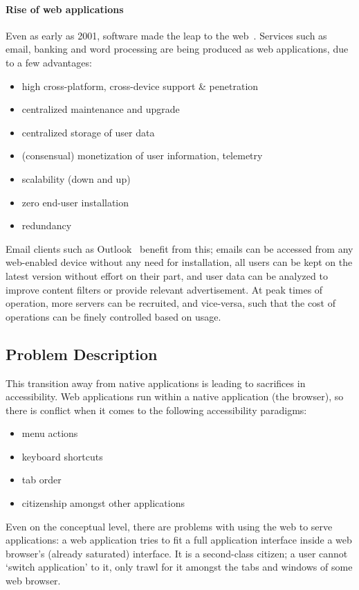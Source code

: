 \documentclass[a4paper, 11pt]{article}
\begin{document}
\paragraph{Rise of web applications}
Even as early as 2001, software made the leap to the web~\cite{ginige2001web}. Services such as email, banking and word processing are being produced as web applications, due to a few advantages:
\begin{itemize}
  \item high cross-platform, cross-device support \& penetration
  \item centralized maintenance and upgrade
  \item centralized storage of user data
  \item (consensual) monetization of user information, telemetry
  \item scalability (down and up)
  \item zero end-user installation
  \item redundancy
\end{itemize}
Email clients such as Outlook~\cite{outlookcom} benefit from this; emails can be accessed from any web-enabled device without any need for installation, all users can be kept on the latest version without effort on their part, and user data can be analyzed to improve content filters or provide relevant advertisement. At peak times of operation, more servers can be recruited, and vice-versa, such that the cost of operations can be finely controlled based on usage.
\subsection{Problem Description}
This transition away from native applications is leading to sacrifices in accessibility. Web applications run within a native application (the browser), so there is conflict when it comes to the following accessibility paradigms:
\begin{itemize}
 \item menu actions
 \item keyboard shortcuts
 \item tab order
 \item citizenship amongst other applications
\end{itemize}

Even on the conceptual level, there are problems with using the web to serve applications: a web application tries to fit a full application interface inside a web browser's (already saturated) interface. It is a second-class citizen; a user cannot `switch application' to it, only trawl for it amongst the tabs and windows of some web browser.
\end{document}

